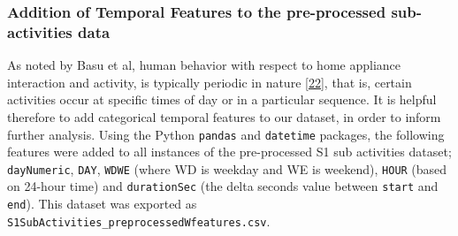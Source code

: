 \documentclass[11pt,]{article}
\begin{document}
\begin{table}[!h]

\caption{\label{tab:TAB_fridge}Example of duplicate sub-activity number removal}
\centering
{}
\end{table}

\hypertarget{addition-of-temporal-features-to-the-pre-processed-sub-activities-data}{%
\subsubsection{Addition of Temporal Features to the pre-processed
sub-activities
data}\label{addition-of-temporal-features-to-the-pre-processed-sub-activities-data}}

As noted by Basu et al, human behavior with respect to home appliance
interaction and activity, is typically periodic in nature
{[}\protect\hyperlink{ref-kaustavbasuApplianceUsagePrediction2012}{22}{]},
that is, certain activities occur at specific times of day or in a
particular sequence. It is helpful therefore to add categorical temporal
features to our dataset, in order to inform further analysis. Using the
Python \texttt{pandas} and \texttt{datetime} packages, the following
features were added to all instances of the pre-processed S1 sub
activities dataset; \texttt{dayNumeric}, \texttt{DAY}, \texttt{WDWE}
(where WD is weekday and WE is weekend), \texttt{HOUR} (based on 24-hour
time) and \texttt{durationSec} (the delta seconds value between
\texttt{start} and \texttt{end}). This dataset was exported as
\texttt{S1SubActivities\_preprocessedWfeatures.csv}.
\end{document}
